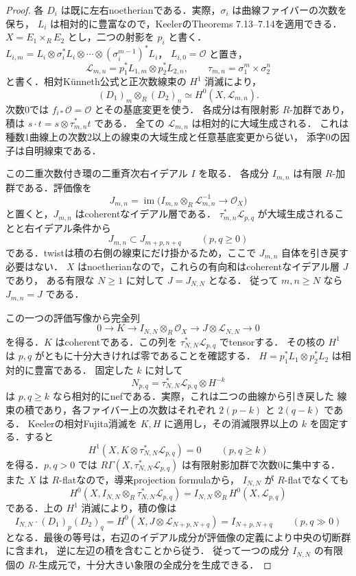 \begin{proof}
各 $D_i$ は既に左右noetherianである．実際，$\sigma_i$ は曲線ファイバーの次数を保ち，
$L_i$ は相対的に豊富なので，KeelerのTheorems 7.13--7.14を適用できる．
$X=E_1\times_R E_2$ とし，二つの射影を $p_i$ と書く．
$L_{i,m}=L_i\otimes\sigma_i^*L_i\otimes\cdots\otimes(\sigma_i^{m-1})^*L_i$，
$L_{i,0}=\mathcal O$ と置き，
\[
 \mathcal L_{m,n}=p_1^*L_{1,m}\otimes p_2^*L_{2,n},\qquad
 \tau_{m,n}=\sigma_1^m\times\sigma_2^n
\]
と書く．相対K\"unneth公式と正次数線束の $H^1$ 消滅により，
\[
 (D_1)_m\otimes_R(D_2)_n\simeq H^0(X,\mathcal L_{m,n}).
\]
次数0では $f_{i*}\mathcal O=\mathcal O$ とその基底変更を使う．
各成分は有限射影 $R$-加群であり，積は
$s\cdot t=s\otimes\tau_{m,n}^*t$ である．
全ての $\mathcal L_{m,n}$ は相対的に大域生成される．
これは種数1曲線上の次数2以上の線束の大域生成と任意基底変更から従い，
添字0の因子は自明線束である．

この二重次数付き環の二重斉次右イデアル $I$ を取る．
各成分 $I_{m,n}$ は有限 $R$-加群である．評価像を
\[
 J_{m,n}=\operatorname{im}
   \bigl(I_{m,n}\otimes_R\mathcal L_{m,n}^{-1}
           \longrightarrow\mathcal O_X\bigr)
\]
と置くと，$J_{m,n}$ はcoherentなイデアル層である．
$\tau_{m,n}^*\mathcal L_{p,q}$ が大域生成されることと右イデアル条件から
\[
 J_{m,n}\subset J_{m+p,n+q}\qquad(p,q\ge0)
\]
である．twistは積の右側の線束にだけ掛かるため，ここで $J_{m,n}$ 自体を引き戻す必要はない．
$X$ はnoetherianなので，これらの有向和はcoherentなイデアル層 $J$ であり，
ある有限な $N\ge1$ に対して $J=J_{N,N}$ となる．
従って $m,n\ge N$ なら $J_{m,n}=J$ である．

この一つの評価写像から完全列
\[
 0\longrightarrow K\longrightarrow I_{N,N}\otimes_R\mathcal O_X
   \longrightarrow J\otimes\mathcal L_{N,N}\longrightarrow0
\]
を得る．$K$ はcoherentである．この列を
$\tau_{N,N}^*\mathcal L_{p,q}$ でtensorする．
その核の $H^1$ は $p,q$ がともに十分大きければ零であることを確認する．
$H=p_1^*L_1\otimes p_2^*L_2$ は相対的に豊富である．
固定した $k$ に対して
\[
 N_{p,q}=\tau_{N,N}^*\mathcal L_{p,q}\otimes H^{-k}
\]
は $p,q\ge k$ なら相対的にnefである．実際，これは二つの曲線から引き戻した
線束の積であり，各ファイバー上の次数はそれぞれ $2(p-k)$ と $2(q-k)$ である．
Keelerの相対Fujita消滅\cite[Theorem 1.5, Erratum Theorem E2.5]{Keeler2003}を
$K,H$ に適用し，その消滅限界以上の $k$ を固定する．すると
\[
 H^1(X,K\otimes\tau_{N,N}^*\mathcal L_{p,q})=0
 \qquad(p,q\ge k)
\]
を得る．$p,q>0$ では
$R\Gamma(X,\tau_{N,N}^*\mathcal L_{p,q})$ は有限射影加群で次数0に集中する．
また $X$ は $R$-flatなので，導来projection formulaから，
$I_{N,N}$ が $R$-flatでなくても
\[
 H^0(X,I_{N,N}\otimes_R\tau_{N,N}^*\mathcal L_{p,q})
       =I_{N,N}\otimes_R H^0(X,\mathcal L_{p,q})
\]
である．上の $H^1$ 消滅により，積の像は
\[
 I_{N,N}\cdot(D_1)_p(D_2)_q
       =H^0(X,J\otimes\mathcal L_{N+p,N+q})
       =I_{N+p,N+q}\qquad(p,q\gg0)
\]
となる．最後の等号は，右辺のイデアル成分が評価像の定義により中央の切断群に含まれ，
逆に左辺の積を含むことから従う．
従って一つの成分 $I_{N,N}$ の有限個の $R$-生成元で，十分大きい象限の全成分を生成できる．


\end{proof}
